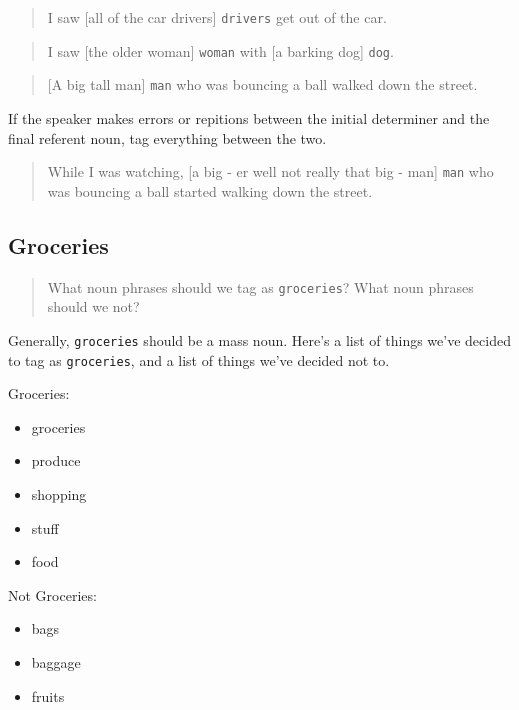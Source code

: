 \documentclass[
]{book}
\providecommand{\tightlist}{%
  \setlength{\itemsep}{0pt}\setlength{\parskip}{0pt}}
\begin{document}
\begin{quote}
I saw {[}all of the car drivers{]} \texttt{drivers} get out of the car.
\end{quote}

\begin{quote}
I saw {[}the older woman{]} \texttt{woman} with {[}a barking dog{]} \texttt{dog}.
\end{quote}

\begin{quote}
{[}A big tall man{]} \texttt{man} who was bouncing a ball walked down the street.
\end{quote}

If the speaker makes errors or repitions
between the initial determiner and the final referent noun,
tag everything between the two.

\begin{quote}
While I was watching,
{[}a big - er well not really that big - man{]} \texttt{man}
who was bouncing a ball started walking down the street.
\end{quote}

\hypertarget{groceries}{%
\subsection{Groceries}\label{groceries}}

\begin{quote}
What noun phrases should we tag as \texttt{groceries}? What noun phrases should we not?
\end{quote}

Generally, \texttt{groceries} should be a mass noun.
Here's a list of things we've decided to tag as \texttt{groceries}, and a list of things we've decided not to.

Groceries:

\begin{itemize}
\tightlist
\item
  groceries
\item
  produce
\item
  shopping
\item
  stuff
\item
  food
\end{itemize}

Not Groceries:

\begin{itemize}
\tightlist
\item
  bags
\item
  baggage
\item
  fruits
\end{itemize}
\end{document}
